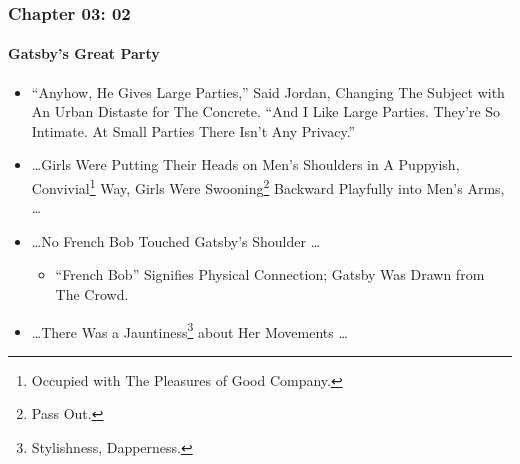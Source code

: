 \begin{frame}
\frametitle{Chapter 03: 02}
\framesubtitle{Gatsby's Great Party}
\label{slide:chapter-03-02}
\begin{itemize}
\item ``Anyhow, He Gives Large Parties,'' Said Jordan, \alert{Changing The Subject with An Urban Distaste for The Concrete}. ``And I Like Large Parties. They're So Intimate. At Small Parties There Isn't Any Privacy.''
\pause\item \dots Girls Were Putting Their Heads on Men's Shoulders in A Puppyish, Convivial\footnote{Occupied with The Pleasures of Good Company.} Way, Girls Were Swooning\footnote{Pass Out.} Backward Playfully into Men's Arms, \dots
\pause\item \dots \alert{No French Bob Touched Gatsby's Shoulder} \dots
\begin{itemize}
\pause\item ``French Bob'' Signifies Physical Connection; Gatsby Was Drawn from The Crowd.
\end{itemize}
\pause\item \dots There Was a Jauntiness\footnote{Stylishness, Dapperness.} about Her Movements \dots
\end{itemize}
\end{frame}
